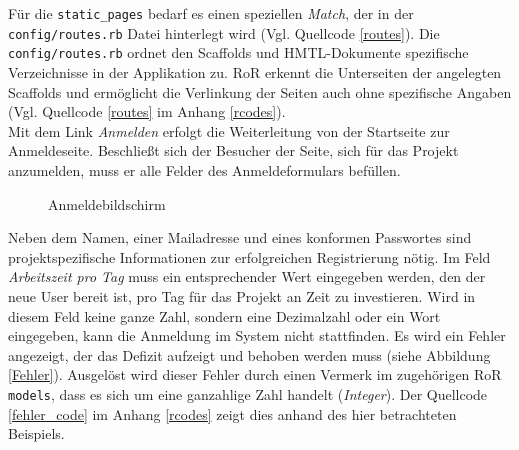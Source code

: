 \documentclass[a4paper,12pt,parskip,bibtotoc,liststotoc]{article}
\begin{document}
Für die \texttt{static\_pages} bedarf es einen speziellen \textit{Match}, der in der \texttt{config/routes.rb} Datei hinterlegt wird (Vgl. Quellcode \ref{routes}). Die \texttt{config/routes.rb} ordnet den Scaffolds und HMTL-Dokumente spezifische Verzeichnisse in der Applikation zu. RoR erkennt die Unterseiten der angelegten Scaffolds und ermöglicht die Verlinkung der Seiten auch ohne spezifische Angaben (Vgl. Quellcode \ref{routes} im Anhang \ref{rcodes}).\\

Mit dem Link \textit{Anmelden} erfolgt die Weiterleitung von der Startseite zur Anmeldeseite. Beschließt sich der Besucher der Seite, sich für das Projekt anzumelden, muss er alle Felder des Anmeldeformulars befüllen.

\begin{figure}[h!]
  \begin{center}
    \caption{Anmeldebildschirm}  \label{Anm}
  \end{center}
\end{figure}

Neben dem Namen, einer Mailadresse und eines konformen Passwortes sind projektspezifische Informationen zur erfolgreichen Registrierung nötig. Im Feld \textit{Arbeitszeit pro Tag} muss ein entsprechender Wert eingegeben werden, den der neue User bereit ist, pro Tag für das Projekt an Zeit zu investieren. Wird in diesem Feld keine ganze Zahl, sondern eine Dezimalzahl oder ein Wort eingegeben, kann die Anmeldung im System nicht stattfinden. Es wird ein Fehler angezeigt, der das Defizit aufzeigt und behoben werden muss (siehe Abbildung \ref{Fehler}). Ausgelöst wird dieser Fehler durch einen Vermerk im zugehörigen RoR \texttt{models}, dass es sich um eine ganzahlige Zahl handelt (\textit{Integer}). Der Quellcode \ref{fehler_code} im Anhang \ref{rcodes} zeigt dies anhand des hier betrachteten Beispiels.\\
\end{document}

